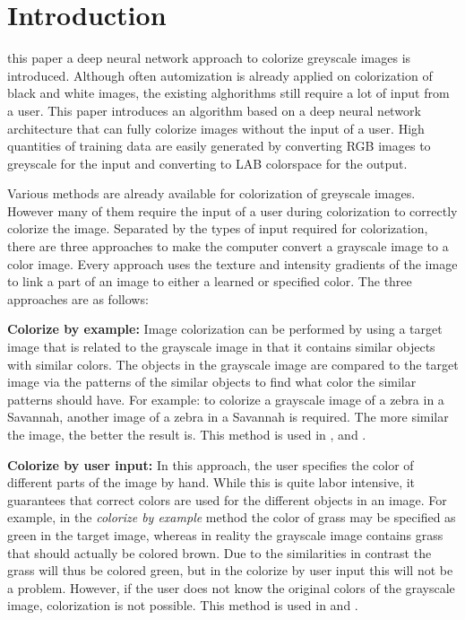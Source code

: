 \section{Introduction}\label{sec:into}

%
%
%

 this paper a deep neural network approach to colorize greyscale images is introduced. Although often automization is already applied on colorization of black and white images, the existing alghorithms still require a lot of input from a user. This paper introduces an algorithm based on a deep neural network architecture that can fully colorize images without the input of a user. High quantities of training data are easily generated by converting RGB images to greyscale for the input and converting to LAB colorspace for the output. 

Various methods are already available for colorization of greyscale images. However many of them require the input of a user during colorization to correctly colorize the image. Separated by the types of input required for colorization, there are three approaches to make the computer convert a grayscale image to a color image. Every approach uses the texture and intensity gradients of the image to link a part of an image to either a learned or specified color. The three approaches are as follows:

\textbf{Colorize by example:} Image colorization can be performed by using a target image that is related to the grayscale image in that it contains similar objects with similar colors. The objects in the grayscale image are compared to the target image via the patterns of the similar objects to find what color the similar patterns should have. For example: to colorize a grayscale image of a zebra in a Savannah, another image of a zebra in a Savannah is required. The more similar the image, the better the result is. This method is used in \cite{Charpiat}, \cite{Gupta} and \cite{Zheng}.

\textbf{Colorize by user input:} In this approach, the user specifies the color of different parts of the image by hand. While this is quite labor intensive, it guarantees that correct colors are used for the different objects in an image. For example, in the \textit{colorize by example} method the color of grass may be specified as green in the target image, whereas in reality the grayscale image contains grass that should actually be colored brown. Due to the similarities in contrast the grass will thus be colored green, but in the colorize by user input this will not be a problem. However, if the user does not know the original colors of the grayscale image, colorization is not possible. This method is used in \cite{Horiuchi} and \cite{Levin}.

